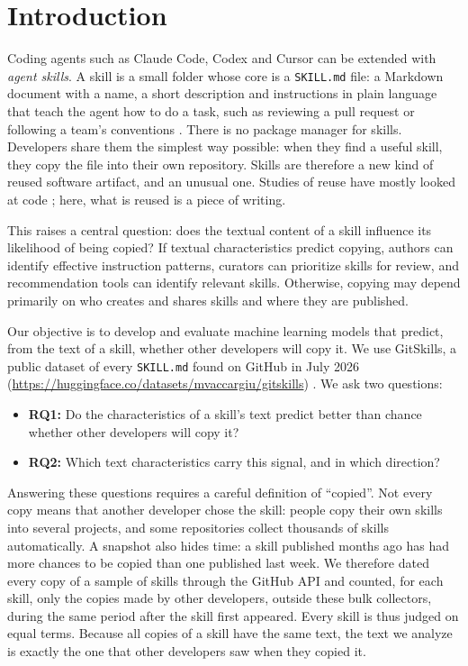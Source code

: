 \section{Introduction}\label{introduction}

Coding agents such as Claude Code, Codex and Cursor can be extended with
\emph{agent skills}. A skill is a small folder whose core is a
\texttt{SKILL.md} file: a Markdown document with a name, a short
description and instructions in plain language that teach the agent how
to do a task, such as reviewing a pull request or following a team's
conventions \cite{agentskills_spec}. There is no package manager for
skills. Developers share them the simplest way possible: when they find
a useful skill, they copy the file into their own repository. Skills are
therefore a new kind of reused software artifact, and an unusual one.
Studies of reuse have mostly looked at code
\cite{haefliger2008code,lopes2017dejavu}; here, what is reused is a
piece of writing.

This raises a central question: does the textual content of a skill
influence its likelihood of being copied? If textual characteristics
predict copying, authors can identify effective instruction patterns,
curators can prioritize skills for review, and recommendation tools can
identify relevant skills. Otherwise, copying may depend primarily on who
creates and shares skills and where they are published.

Our objective is to develop and evaluate machine learning models that
predict, from the text of a skill, whether other developers will copy
it. We use GitSkills, a public dataset of every \texttt{SKILL.md} found
on GitHub in July 2026
(\url{https://huggingface.co/datasets/mvaccargiu/gitskills})
\cite{gitskills2027}. We ask two questions:

\begin{itemize}
\tightlist
\item
  \textbf{RQ1:} Do the characteristics of a skill's text predict better
  than chance whether other developers will copy it?
\item
  \textbf{RQ2:} Which text characteristics carry this signal, and in
  which direction?
\end{itemize}

Answering these questions requires a careful definition of ``copied''.
Not every copy means that another developer chose the skill: people copy
their own skills into several projects, and some repositories collect
thousands of skills automatically. A snapshot also hides time: a skill
published months ago has had more chances to be copied than one
published last week. We therefore dated every copy of a sample of skills
through the GitHub API and counted, for each skill, only the copies made
by other developers, outside these bulk collectors, during the same
period after the skill first appeared. Every skill is thus judged on
equal terms. Because all copies of a skill have the same text, the text
we analyze is exactly the one that other developers saw when they copied
it.

